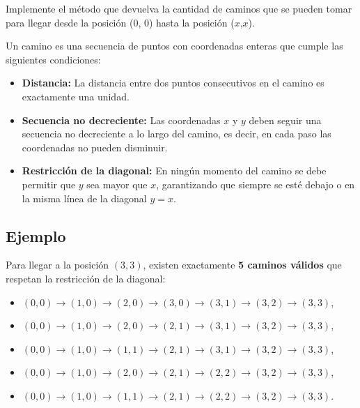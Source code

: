 Implemente el método que devuelva la cantidad de caminos que se pueden tomar para llegar desde la posición (0, 0) hasta la posición ($x$,$x$).

Un camino es una secuencia de puntos con coordenadas enteras que cumple las siguientes condiciones:

\begin{itemize}
    \item \textbf{Distancia:} La distancia entre dos puntos consecutivos en el camino es exactamente una unidad.
    \item \textbf{Secuencia no decreciente:} Las coordenadas \(x\) y \(y\) deben seguir una secuencia no decreciente a lo largo del camino, es decir, en cada paso las coordenadas no pueden disminuir.
    \item \textbf{Restricción de la diagonal:} En ningún momento del camino se debe permitir que \(y\) sea mayor que \(x\), garantizando que siempre se esté debajo o en la misma línea de la diagonal \(y = x\).
\end{itemize}

\subsection*{Ejemplo}
Para llegar a la posición \((3, 3)\), existen exactamente \textbf{5 caminos válidos} que respetan la restricción de la diagonal:

\begin{itemize}
    \item \((0, 0) \to (1, 0) \to (2, 0) \to (3, 0) \to (3, 1) \to (3, 2) \to (3, 3)\),
    \item \((0, 0) \to (1, 0) \to (2, 0) \to (2, 1) \to (3, 1) \to (3, 2) \to (3, 3)\),
    \item \((0, 0) \to (1, 0) \to (1, 1) \to (2, 1) \to (3, 1) \to (3, 2) \to (3, 3)\),
    \item \((0, 0) \to (1, 0) \to (2, 0) \to (2, 1) \to (2, 2) \to (3, 2) \to (3, 3)\),
    \item \((0, 0) \to (1, 0) \to (1, 1) \to (2, 1) \to (2, 2) \to (3, 2) \to (3, 3)\).
\end{itemize}